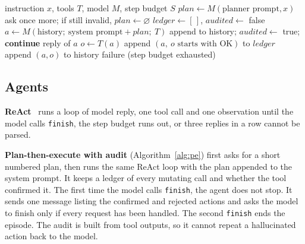 \documentclass[10pt,a4paper,twocolumn]{article}
\begin{document}
\begin{algorithm}[t]
\caption{Plan-then-execute with a final action audit}\label{alg:pe}
\small
\begin{algorithmic}[1]
\Require instruction $x$, tools $T$, model $M$, step budget $S$
\State $\mathit{plan}\gets M(\text{planner prompt}, x)$ 
 \State ask once more; if still invalid, $\mathit{plan}\gets\varnothing$ \EndIf
\State $\mathit{ledger}\gets[\,]$, $\mathit{audited}\gets$ false
  \State $a\gets M(\text{history};\ \text{system prompt}+\mathit{plan};\ T)$
      \State append  to history; $\mathit{audited}\gets$ true; \textbf{continue}
    \EndIf
    \State \Return reply of $a$
  \EndIf
  \State $o\gets T(a)$ 
   append $(a,\ o \text{ starts with OK})$ to $\mathit{ledger}$ \EndIf
  \State append $(a,o)$ to history
\EndFor
\State \Return failure (step budget exhausted)
\end{algorithmic}
\end{algorithm}

\subsection{Agents}
\textbf{ReAct}~\cite{react} runs a loop of model reply, one tool call and one observation until the model calls
\texttt{finish}, the step budget runs out, or three replies in a row cannot be parsed.

\textbf{Plan-then-execute with audit} (Algorithm~\ref{alg:pe}) first asks for a short numbered plan, then runs the same
ReAct loop with the plan appended to the system prompt. It keeps a ledger of every mutating call and whether the tool
confirmed it. The first time the model calls \texttt{finish}, the agent does not stop. It sends one message listing the
confirmed and rejected actions and asks the model to finish only if every request has been handled. The second
\texttt{finish} ends the episode. The audit is built from tool outputs, so it cannot repeat a hallucinated action back to
the model.
\end{document}
